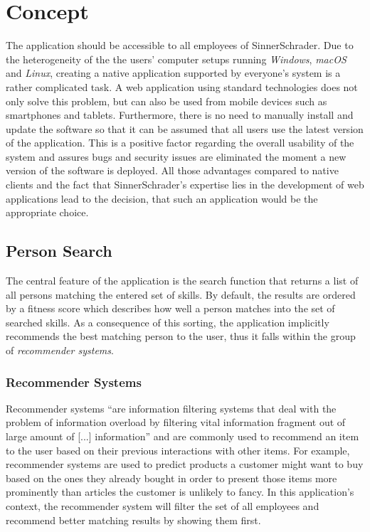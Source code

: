 \chapter{Concept}
The application should be accessible to all employees of SinnerSchrader. Due to the heterogeneity of the the users' computer setups running \textit{Windows}, \textit{macOS} and \textit{Linux}, creating a native application supported by everyone’s system is a rather complicated task. A web application using standard technologies does not only solve this problem, but can also be used from mobile devices such as smartphones and tablets. Furthermore, there is no need to manually install and update the software so that it can be assumed that all users use the latest version of the application. This is a positive factor regarding the overall usability of the system and assures bugs and security issues are eliminated the moment a new version of the software is deployed. All those advantages compared to native clients and the fact that SinnerSchrader’s expertise lies in the development of web applications lead to the decision, that such an application would be the appropriate choice.

\section{Person Search}
The central feature of the application is the search function that returns a list of all persons matching the entered set of skills. By default, the results are ordered by a fitness score which describes how well a person matches into the set of searched skills. As a consequence of this sorting, the application implicitly recommends the best matching person to the user, thus it falls within the group of \textit{recommender systems}.

\subsection{Recommender Systems}
Recommender systems ``are information filtering systems that deal with the problem of information overload by filtering vital information fragment out of large amount of [...] information'' \cite{Isinkaye2015261}\label{recommender-definition} and are commonly used to recommend an item to the user based on their previous interactions with other items. For example, recommender systems are used to predict products a customer might want to buy based on the ones they already bought in order to present those items more prominently than articles the customer is unlikely to fancy. In this application's context, the recommender system will filter the set of all employees and recommend better matching results by showing them first.

